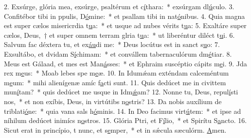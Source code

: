 2. Exsúrge, glória mea, exsúrge, psaltérum et c\uline{í}thara:~* exsúrgam dl\uline{ú}culo.
3. Confitébor tibi in ppulis, D\uline{ó}mine:~* et psallam tibi in nat\uline{ó}nibus.
4. Quia magna est super cælos misericrdia t\uline{u}a:~* et usque ad nubes vérits t\uline{u}a:
5. Exaltáre super cælos, Deus,~† et super omnem terram glria t\uline{u}a:~* ut liberéntur diléct t\uline{u}i.
6. Salvum fac déxtera tu, et ex\uline{áu}di me:~* Deus locútus est in sanct s\uline{u}o:
7. Exsultábo, et dvidam S\uline{í}chimam:~* et convállem tabernaculórum dm\uline{é}tiar.
8. Meus est Gálaad, et mes est Man\uline{á}sses:~* et Ephraim suscéptio cápits m\uline{e}i.
9. Jda rex m\uline{e}us:~* Moab lebes spe m\uline{e}æ.
10. In Idumǽam exténdam calceméntum m\uline{e}um:~* mihi alienígenæ amíc f\uline{a}cti sunt.
11. Quis dedúcet me in civittem mun\uline{í}tam?~* quis dedúcet me usque in Idm\uline{ǽ}am?
12. Nonne tu, Deus,  repul\uline{í}sti nos,~* et non exíbis, Deus, in virtútibs n\uline{o}stris?
13. Da nobis auxílium de triblati\uline{ó}ne:~* quia vana sals h\uline{ó}minis.
14. In Deo facimus virt\uline{ú}tem:~* et ipse ad níhilum dedúcet inimícs n\uline{o}stros.
15. Glória Ptri, et F\uline{í}lio,~* et Spirítu S\uline{a}ncto.
16. Sicut erat in princípio, t nunc, et s\uline{e}mper,~* et in sǽcula sæculórm. \uline{A}men.

